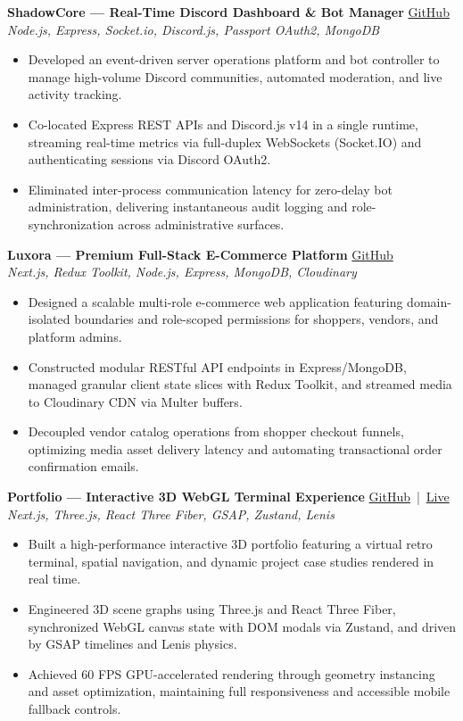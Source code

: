 \documentclass[letterpaper,11pt]{article}
\newcommand{\resumeItem}[1]{\item \small{#1}}
\newcommand{\resumeListStart}{\begin{itemize}[leftmargin=0.18in, itemsep=2pt, topsep=4pt]}
\newcommand{\resumeListEnd}{\end{itemize}\vspace{6pt}}
\newcommand{\projectTech}[1]{{\small\textit{#1}}}
\begin{document}
\newpage
\textbf{ShadowCore — Real-Time Discord Dashboard \& Bot Manager} \hfill \href{https://github.com/VortexDevX/ShadowCore}{GitHub} \\
\projectTech{Node.js, Express, Socket.io, Discord.js, Passport OAuth2, MongoDB}
\resumeListStart
\resumeItem{Developed an event-driven server operations platform and bot controller to manage high-volume Discord communities, automated moderation, and live activity tracking.}
\resumeItem{Co-located Express REST APIs and Discord.js v14 in a single runtime, streaming real-time metrics via full-duplex WebSockets (Socket.IO) and authenticating sessions via Discord OAuth2.}
\resumeItem{Eliminated inter-process communication latency for zero-delay bot administration, delivering instantaneous audit logging and role-synchronization across administrative surfaces.}
\resumeListEnd

\textbf{Luxora — Premium Full-Stack E-Commerce Platform} \hfill \href{https://github.com/VortexDevX/E-Commerce}{GitHub} \\
\projectTech{Next.js, Redux Toolkit, Node.js, Express, MongoDB, Cloudinary}
\resumeListStart
\resumeItem{Designed a scalable multi-role e-commerce web application featuring domain-isolated boundaries and role-scoped permissions for shoppers, vendors, and platform admins.}
\resumeItem{Constructed modular RESTful API endpoints in Express/MongoDB, managed granular client state slices with Redux Toolkit, and streamed media to Cloudinary CDN via Multer buffers.}
\resumeItem{Decoupled vendor catalog operations from shopper checkout funnels, optimizing media asset delivery latency and automating transactional order confirmation emails.}
\resumeListEnd

\textbf{Portfolio — Interactive 3D WebGL Terminal Experience} \hfill \href{https://github.com/VortexDevX/Portfolio}{GitHub} \,|\, \href{https://vxdev.in/}{Live} \\
\projectTech{Next.js, Three.js, React Three Fiber, GSAP, Zustand, Lenis}
\resumeListStart
\resumeItem{Built a high-performance interactive 3D portfolio featuring a virtual retro terminal, spatial navigation, and dynamic project case studies rendered in real time.}
\resumeItem{Engineered 3D scene graphs using Three.js and React Three Fiber, synchronized WebGL canvas state with DOM modals via Zustand, and driven by GSAP timelines and Lenis physics.}
\resumeItem{Achieved 60 FPS GPU-accelerated rendering through geometry instancing and asset optimization, maintaining full responsiveness and accessible mobile fallback controls.}
\resumeListEnd
\end{document}
